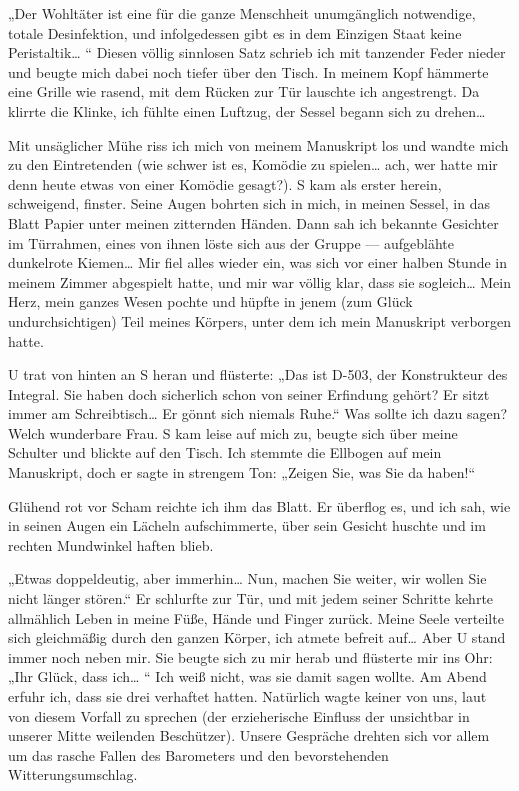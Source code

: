 „Der Wohltäter ist eine für die ganze Menschheit unumgänglich
notwendige, totale Desinfektion, und infolgedessen gibt es in dem
Einzigen Staat keine Peristaltik\ldots{} “ Diesen völlig sinnlosen Satz
schrieb ich mit tanzender Feder nieder und beugte mich dabei noch
tiefer über den Tisch. In meinem Kopf hämmerte eine Grille wie
rasend, mit dem Rücken zur Tür lauschte ich angestrengt. Da klirrte
die Klinke, ich fühlte einen Luftzug, der Sessel begann sich zu
drehen\ldots{}

Mit unsäglicher Mühe riss ich mich von meinem Manuskript los und
wandte mich zu den Eintretenden (wie schwer ist es, Komödie zu
spielen\ldots{} ach, wer hatte mir denn heute etwas von einer Komödie
gesagt?). S kam als erster herein, schweigend, finster. Seine Augen
bohrten sich in mich, in meinen Sessel, in das Blatt Papier unter
meinen zitternden Händen. Dann sah ich bekannte Gesichter im
Türrahmen, eines von ihnen löste sich aus der Gruppe — aufgeblähte
dunkelrote Kiemen\ldots{} Mir fiel alles wieder ein, was sich vor einer
halben Stunde in meinem Zimmer abgespielt hatte, und mir war völlig
klar, dass sie sogleich\ldots{} Mein Herz, mein ganzes Wesen pochte und
hüpfte in jenem (zum Glück undurchsichtigen) Teil meines Körpers,
unter dem ich mein Manuskript verborgen hatte.

U trat von hinten an S heran und flüsterte: „Das ist D-503, der
Konstrukteur des Integral. Sie haben doch sicherlich schon von
seiner Erfindung gehört? Er sitzt immer am Schreibtisch\ldots{} Er gönnt
sich niemals Ruhe.“ Was sollte ich dazu sagen? Welch wunderbare
Frau. S kam leise auf mich zu, beugte sich über meine Schulter und
blickte auf den Tisch. Ich stemmte die Ellbogen auf mein
Manuskript, doch er sagte in strengem Ton: „Zeigen Sie, was Sie da
haben!“

Glühend rot vor Scham reichte ich ihm das Blatt. Er überflog es,
und ich sah, wie in seinen Augen ein Lächeln aufschimmerte, über
sein Gesicht huschte und im rechten Mundwinkel haften blieb.

„Etwas doppeldeutig, aber immerhin\ldots{} Nun, machen Sie weiter, wir
wollen Sie nicht länger stören.“ Er schlurfte zur Tür, und mit
jedem seiner Schritte kehrte allmählich Leben in meine Füße, Hände
und Finger zurück. Meine Seele verteilte sich gleichmäßig durch den
ganzen Körper, ich atmete befreit auf\ldots{} Aber U stand immer noch
neben mir. Sie beugte sich zu mir herab und flüsterte mir ins Ohr:
„Ihr Glück, dass ich\ldots{} “ Ich weiß nicht, was sie damit sagen
wollte. Am Abend erfuhr ich, dass sie drei verhaftet hatten.
Natürlich wagte keiner von uns, laut von diesem Vorfall zu sprechen
(der erzieherische Einfluss der unsichtbar in unserer Mitte
weilenden Beschützer). Unsere Gespräche drehten sich vor allem um
das rasche Fallen des Barometers und den bevorstehenden
Witterungsumschlag.

